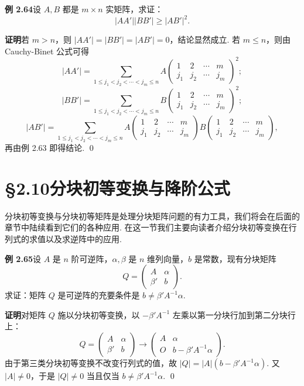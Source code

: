 \documentclass[UTF8,12pt,a4paper,fontset=fandol]{ctexart}
\begin{document}
\noindent\textbf{例 2.64}\quad 设 $A,B$ 都是 $m\times n$ 实矩阵，求证：
\[
|AA'||BB'|\ge |AB'|^2.
\]

\noindent\textbf{证明}\quad 若 $m>n$，则 $|AA'|=|BB'|=|AB'|=0$，结论显然成立.
若 $m\le n$，则由 Cauchy-Binet 公式可得
\[
|AA'|=\sum_{1\le j_1<j_2<\cdots<j_m\le n}
A\left(
\begin{array}{cccc}
1 & 2 & \cdots & m\\
j_1 & j_2 & \cdots & j_m
\end{array}
\right)^2;
\]
\[
|BB'|=\sum_{1\le j_1<j_2<\cdots<j_m\le n}
B\left(
\begin{array}{cccc}
1 & 2 & \cdots & m\\
j_1 & j_2 & \cdots & j_m
\end{array}
\right)^2;
\]
\[
|AB'|=\sum_{1\le j_1<j_2<\cdots<j_m\le n}
A\left(
\begin{array}{cccc}
1 & 2 & \cdots & m\\
j_1 & j_2 & \cdots & j_m
\end{array}
\right)
B\left(
\begin{array}{cccc}
1 & 2 & \cdots & m\\
j_1 & j_2 & \cdots & j_m
\end{array}
\right),
\]
再由例 2.63 即得结论. \qed

\section*{§2.10\quad 分块初等变换与降阶公式}

分块初等变换与分块初等矩阵是处理分块矩阵问题的有力工具，我们将会在后面的章节中陆续看到它们的各种应用. 在这一节我们主要向读者介绍分块初等变换在行列式的求值以及求逆阵中的应用.

\noindent\textbf{例 2.65}\quad 设 $A$ 是 $n$ 阶可逆阵，$\alpha,\beta$ 是 $n$ 维列向量，$b$ 是常数，现有分块矩阵
\[
Q=
\left(
\begin{array}{cc}
A & \alpha\\
\beta' & b
\end{array}
\right).
\]
求证：矩阵 $Q$ 是可逆阵的充要条件是 $b\ne \beta'A^{-1}\alpha$.

\noindent\textbf{证明}\quad 对矩阵 $Q$ 施以分块初等变换，以 $-\beta'A^{-1}$ 左乘以第一分块行加到第二分块行上：
\[
Q=
\left(
\begin{array}{cc}
A & \alpha\\
\beta' & b
\end{array}
\right)
\to
\left(
\begin{array}{cc}
A & \alpha\\
O & b-\beta'A^{-1}\alpha
\end{array}
\right).
\]
由于第三类分块初等变换不改变行列式的值，故 $|Q|=|A|(b-\beta'A^{-1}\alpha)$. 又 $|A|\ne0$，于是 $|Q|\ne0$ 当且仅当 $b\ne\beta'A^{-1}\alpha$. \qed
\end{document}
